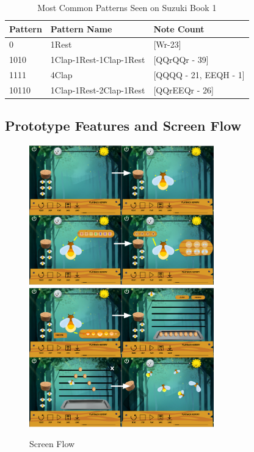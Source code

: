 \begin{table}[H]
\begin{tabular}{|l|l|l|}
\hline
Pattern & Pattern Name            & Note Count                \\ \hline
0       & 1Rest                   & {[}Wr-23{]}               \\ \hline
1010    & 1Clap-1Rest-1Clap-1Rest & {[}QQrQQr - 39{]}         \\ \hline
1111    & 4Clap                   & {[}QQQQ - 21, EEQH - 1{]} \\ \hline
10110   & 1Clap-1Rest-2Clap-1Rest & {[}QQrEEQr - 26{]}        \\ \hline
\end{tabular}
\caption{Most Common Patterns Seen on Suzuki Book 1}
\label{patterns}
\end{table}

\subsection{Prototype Features and Screen Flow}
\begin{figure}[H]
    \centering
    \includegraphics[width=8cm]{NewFigures/RESTCON1.png}
    \includegraphics[width=8cm]{NewFigures/RESTCON2.png}
    \caption{Screen Flow}
    \label{fig:Screenflow1}
\end{figure}

